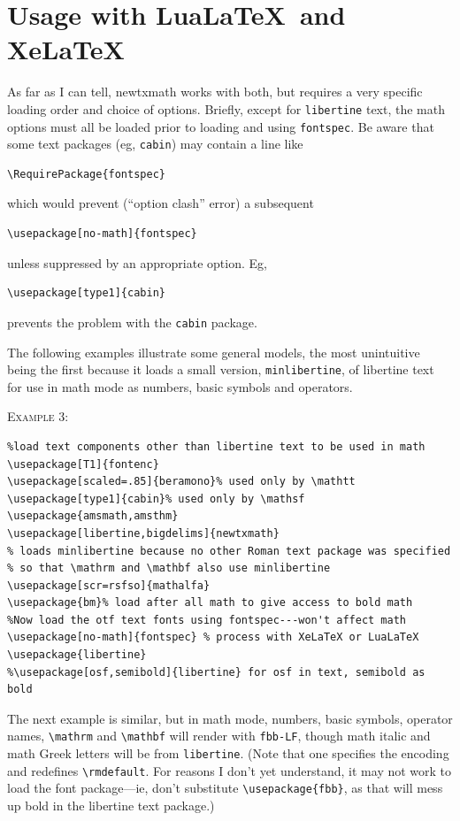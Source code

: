 \documentclass[11pt]{article}
\theoremstyle{oldplain}
\theoremstyle{plain}
\begin{document}
\section{Usage with Lua\LaTeX\ and Xe\LaTeX}
As far as I can tell, \textsf{newtxmath} works with both, but requires a very specific loading order and choice of options. Briefly, except for {\tt libertine} text, the math options must all be loaded prior to loading and using {\tt fontspec}. Be aware that some text packages (eg, {\tt cabin}) may contain a line like
\begin{verbatim}
\RequirePackage{fontspec}
\end{verbatim}
which would prevent (``option clash'' error) a subsequent 
\begin{verbatim}
\usepackage[no-math]{fontspec}
\end{verbatim}
unless suppressed by an appropriate option. Eg, 
\begin{verbatim}
\usepackage[type1]{cabin}
\end{verbatim}
prevents the problem with the {\tt cabin} package.

The following examples illustrate some general models, the most unintuitive being the first because it loads a small version, {\tt minlibertine}, of libertine text for use in math mode as numbers, basic symbols and operators.

\textsc{Example 3:}
\begin{verbatim}
%load text components other than libertine text to be used in math
\usepackage[T1]{fontenc}
\usepackage[scaled=.85]{beramono}% used only by \mathtt
\usepackage[type1]{cabin}% used only by \mathsf
\usepackage{amsmath,amsthm}
\usepackage[libertine,bigdelims]{newtxmath}
% loads minlibertine because no other Roman text package was specified
% so that \mathrm and \mathbf also use minlibertine
\usepackage[scr=rsfso]{mathalfa}
\usepackage{bm}% load after all math to give access to bold math
%Now load the otf text fonts using fontspec---won't affect math
\usepackage[no-math]{fontspec} % process with XeLaTeX or LuaLaTeX
\usepackage{libertine}
%\usepackage[osf,semibold]{libertine} for osf in text, semibold as bold
\end{verbatim}
The next example is similar, but in math mode, numbers, basic symbols, operator names, \verb|\mathrm| and \verb|\mathbf| will render with {\tt fbb-LF}, though  math italic and math Greek letters will be from {\tt libertine}. (Note that one specifies the encoding and redefines \verb|\rmdefault|. For reasons I don't yet understand, it may not work to load the font package---ie, don't substitute \verb|\usepackage{fbb}|, as that will mess up bold in the libertine text package.) 
\end{document}
